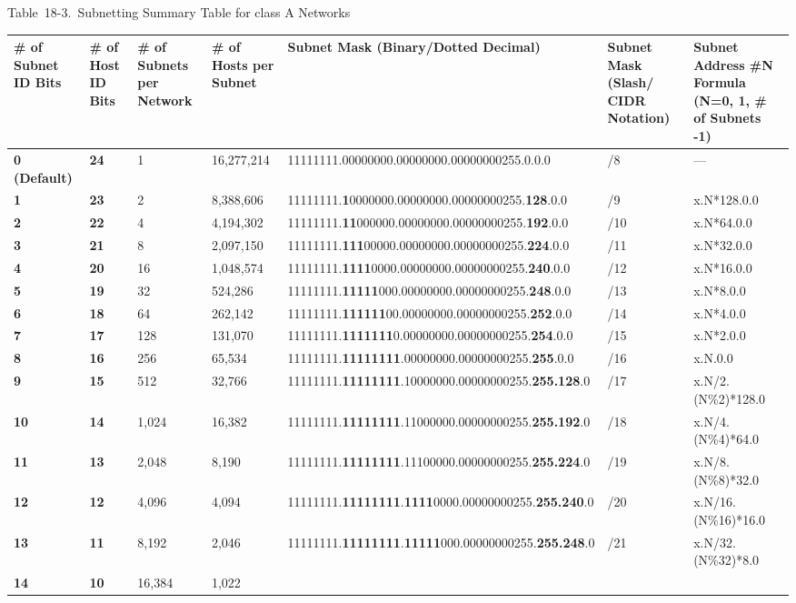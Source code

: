 Table~18-3.~Subnetting Summary Table for class A Networks

\begin{longtable}[]{@{}lllllll@{}}
\toprule
\# of Subnet ID Bits & \# of Host ID Bits & \# of Subnets per Network &
\# of Hosts per Subnet & Subnet Mask (Binary/Dotted Decimal) & Subnet
Mask (Slash/ CIDR Notation) & Subnet Address \#N Formula (N=0, 1, \# of
Subnets -1)\tabularnewline
\midrule
\endhead
{\textbf{0 (Default)}} & {\textbf{24}} & 1 & 16,277,214 &
11111111.00000000.00000000.00000000255.0.0.0 & /8 & ---\tabularnewline
{\textbf{1}} & {\textbf{23}} & 2 & 8,388,606 &
11111111.{\textbf{1}}0000000.00000000.00000000255.{\textbf{128}}.0.0 &
/9 & x.N*128.0.0\tabularnewline
{\textbf{2}} & {\textbf{22}} & 4 & 4,194,302 &
11111111.{\textbf{11}}000000.00000000.00000000255.{\textbf{192}}.0.0 &
/10 & x.N*64.0.0\tabularnewline
{\textbf{3}} & {\textbf{21}} & 8 & 2,097,150 &
11111111.{\textbf{111}}00000.00000000.00000000255.{\textbf{224}}.0.0 &
/11 & x.N*32.0.0\tabularnewline
{\textbf{4}} & {\textbf{20}} & 16 & 1,048,574 &
11111111.{\textbf{1111}}0000.00000000.00000000255.{\textbf{240}}.0.0 &
/12 & x.N*16.0.0\tabularnewline
{\textbf{5}} & {\textbf{19}} & 32 & 524,286 &
11111111.{\textbf{11111}}000.00000000.00000000255.{\textbf{248}}.0.0 &
/13 & x.N*8.0.0\tabularnewline
{\textbf{6}} & {\textbf{18}} & 64 & 262,142 &
11111111.{\textbf{111111}}00.00000000.00000000255.{\textbf{252}}.0.0 &
/14 & x.N*4.0.0\tabularnewline
{\textbf{7}} & {\textbf{17}} & 128 & 131,070 &
11111111.{\textbf{1111111}}0.00000000.00000000255.{\textbf{254}}.0.0 &
/15 & x.N*2.0.0\tabularnewline
{\textbf{8}} & {\textbf{16}} & 256 & 65,534 &
11111111.{\textbf{11111111}}.00000000.00000000255.{\textbf{255}}.0.0 &
/16 & x.N.0.0\tabularnewline
{\textbf{9}} & {\textbf{15}} & 512 & 32,766 &
11111111.{\textbf{11111111}}.10000000.00000000255.{\textbf{255.128}}.0 &
/17 & x.N/2.(N\%2)*128.0\tabularnewline
{\textbf{10}} & {\textbf{14}} & 1,024 & 16,382 &
11111111.{\textbf{11111111}}.11000000.00000000255.{\textbf{255.192}}.0 &
/18 & x.N/4.(N\%4)*64.0\tabularnewline
{\textbf{11}} & {\textbf{13}} & 2,048 & 8,190 &
11111111.{\textbf{11111111}}.11100000.00000000255.{\textbf{255.224}}.0 &
/19 & x.N/8.(N\%8)*32.0\tabularnewline
{\textbf{12}} & {\textbf{12}} & 4,096 & 4,094 &
11111111.{\textbf{11111111}}.{\textbf{1111}}0000.00000000255.{\textbf{255.240}}.0
& /20 & x.N/16.(N\%16)*16.0\tabularnewline
{\textbf{13}} & {\textbf{11}} & 8,192 & 2,046 &
11111111.{\textbf{11111111}}.{\textbf{11111}}000.00000000255.{\textbf{255.248}}.0
& /21 & x.N/32.(N\%32)*8.0\tabularnewline
{\textbf{14}} & {\textbf{10}} & 16,384 & 1,022 &

\end{longtable}
